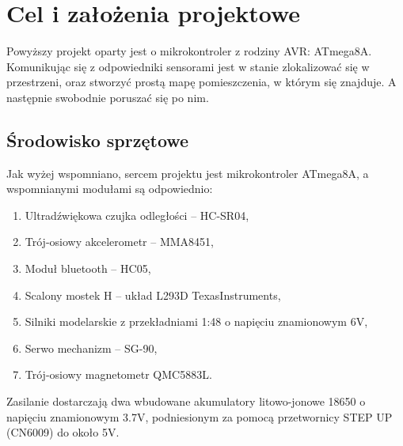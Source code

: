 \section{Cel i założenia projektowe}
    \tab Powyższy projekt oparty jest o mikrokontroler z rodziny AVR: ATmega8A.
    Komunikując się z odpowiedniki sensorami jest w stanie zlokalizować się w przestrzeni,
    oraz stworzyć prostą mapę pomieszczenia, w którym się znajduje. A następnie swobodnie poruszać się po nim.

    \subsection{Środowisko sprzętowe}
        \tab Jak wyżej wspomniano, sercem projektu jest mikrokontroler ATmega8A, a wspomnianymi modułami są odpowiednio:
        \begin{enumerate}
            \item Ultradźwiękowa czujka odległości -- HC-SR04,
            \item Trój-osiowy akcelerometr -- MMA8451,
            \item Moduł bluetooth -- HC05,
            \item Scalony mostek H -- układ L293D TexasInstruments,
            \item Silniki modelarskie z przekładniami 1:48 o napięciu znamionowym 6V,
            \item Serwo mechanizm -- SG-90,
            \item Trój-osiowy magnetometr QMC5883L.
        \end{enumerate}
% 
        Zasilanie dostarczają dwa wbudowane akumulatory litowo-jonowe 18650 o napięciu znamionowym 3.7V, podniesionym za pomocą przetwornicy STEP UP (CN6009) do około 5V.

